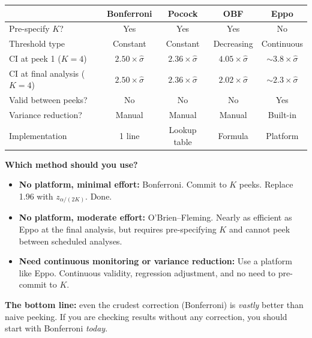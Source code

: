 \documentclass[12pt, a4paper]{article}
\begin{document}
\begin{center}
\renewcommand{\arraystretch}{1.3}
\begin{tabular}{@{} l c c c c @{}}
\toprule
& \textbf{Bonferroni} & \textbf{Pocock} & \textbf{OBF} & \textbf{Eppo} \\
\midrule
Pre-specify $K$?
  & Yes & Yes & Yes & No \\
Threshold type
  & Constant & Constant & Decreasing & Continuous \\
CI at peek 1 ($K{=}4$)
  & $2.50\times\hat{\sigma}$ & $2.36\times\hat{\sigma}$
  & $4.05\times\hat{\sigma}$ & $\sim\!3.8\times\hat{\sigma}$ \\
CI at final analysis ($K{=}4$)
  & $2.50\times\hat{\sigma}$ & $2.36\times\hat{\sigma}$
  & $2.02\times\hat{\sigma}$ & $\sim\!2.3\times\hat{\sigma}$ \\
Valid between peeks?
  & No & No & No & Yes \\
Variance reduction?
  & Manual & Manual & Manual & Built-in \\
Implementation
  & 1 line & Lookup table & Formula & Platform \\
\bottomrule
\end{tabular}
\end{center}

\begin{keytakeaway}
\textbf{Which method should you use?}
\begin{itemize}[nosep]
  \item \textbf{No platform, minimal effort:} Bonferroni.  Commit to $K$
        peeks.  Replace 1.96 with $z_{\alpha/(2K)}$.  Done.
  \item \textbf{No platform, moderate effort:} O'Brien--Fleming.  Nearly as
        efficient as Eppo at the final analysis, but requires pre-specifying
        $K$ and cannot peek between scheduled analyses.
  \item \textbf{Need continuous monitoring or variance reduction:} Use a
        platform like Eppo.  Continuous validity, regression adjustment, and
        no need to pre-commit to $K$.
\end{itemize}

\textbf{The bottom line:} even the crudest correction (Bonferroni) is
\emph{vastly} better than naive peeking.  If you are checking results
without any correction, you should start with Bonferroni \emph{today}.
\end{keytakeaway}


\newpage
\end{document}
